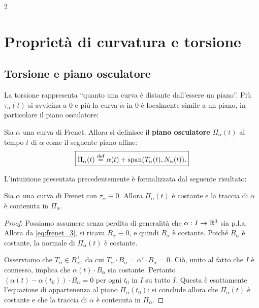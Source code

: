 \begin{multicols*}{2}
    \section{Proprietà di curvatura e torsione}

    \subsection{Torsione e piano osculatore}

    La torsione rappresenta ``quanto una curva è distante dall'essere un piano''.
    Più $\tau_\alpha(t)$ si avvicina a $0$ e più la curva $\alpha$ in $0$ è
    localmente simile a un piano, in particolare il piano osculatore:

    \begin{definition}
        Sia $\alpha$ una curva di Frenet. Allora si definisce
        il \textbf{piano osculatore} $\Pi_\alpha(t)$ al tempo $t$ di
        $\alpha$ come il seguente piano affine:
        \[ \boxed{\Pi_\alpha(t) \overset{\mathrm{def}}{=} \alpha(t) + \operatorname{span}(T_\alpha(t), N_\alpha(t)).} \]
    \end{definition}

    L'intuizione presentata precedentemente è formalizzata dal seguente risultato:

    \begin{proposition}
        Sia $\alpha$ una curva di Frenet con $\tau_\alpha \equiv 0$. Allora
        $\Pi_\alpha(t)$ è costante e la traccia di $\alpha$ è contenuta in
        $\Pi_\alpha$.
    \end{proposition}

    \begin{proof}
        Possiamo assumere senza perdita di generalità che $\alpha : I \to \mathbb{R}^3$ sia p.l.a.
        Allora da \eqref{eq:frenet_3}, si ricava $\dot{B_\alpha} \equiv 0$,
        e quindi $B_\alpha$ è costante. Poiché $B_\alpha$ è costante, la normale
        di $\Pi_\alpha(t)$ è costante. \smallskip

        Osserviamo che $T_\alpha \in B_\alpha^\perp$,
        da cui $T_\alpha \cdot B_\alpha = \alpha' \cdot B_\alpha = 0$. Ciò, unito al fatto
        che $I$ è connesso, implica che $\alpha(t) \cdot B_\alpha$ sia costante. Pertanto
        $(\alpha(t) - \alpha(t_0)) \cdot B_\alpha = 0$ per ogni $t_0$ in $I$ su tutto $I$.
        Questa è esattamente l'equazione di appartenenza al piano $\Pi_\alpha(t_0)$: si conclude
        allora che $\Pi_\alpha(t)$ è costante e che la traccia di $\alpha$ è contenuta in
        $\Pi_\alpha$.
    \end{proof}


\end{multicols*}
